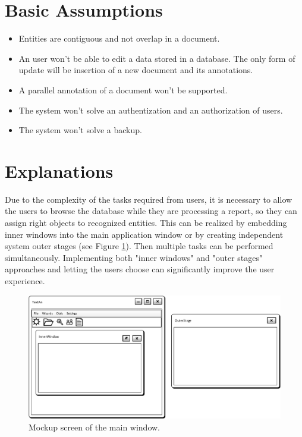 \section{Basic Assumptions}
\begin{itemize}
	\item Entities are contiguous and not overlap in a document.
	\item An user won't be able to edit a data stored in a database. The only form
	of update will be insertion of a new document and its annotations.
	\item A parallel annotation of a document won't be supported.
	\item The system won't solve an authentization and  an authorization of users.
	\item The system won't solve a backup.
\end{itemize}

\section{Explanations}


Due to the complexity of the tasks required from users, it is necessary to allow
the users to browse the database while they are processing a report, so they
can assign right objects to recognized entities. This can be realized by
embedding inner windows into the main application window or by creating
independent system outer stages (see Figure \ref{fig:MockupMainWindow}).
Then multiple tasks can be performed simultaneously. Implementing both
"inner windows" and "outer stages" approaches and letting the users choose can
significantly improve the user experience.

\begin{figure}[!htb]
        \centering
        \includegraphics[width=\textwidth]{Images/MockupMainWindow}
        \caption{Mockup screen of the main window.}
        \label{fig:MockupMainWindow}
\end{figure}
